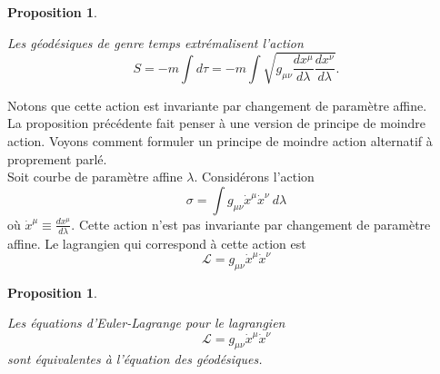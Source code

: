 \documentclass[a4paper,11pt]{report}
\theoremstyle{definition}
\theoremstyle{plain}
\newtheorem{prop}[thm]{Proposition}
\theoremstyle{definition}
\theoremstyle{remark}
\begin{document}
            \begin{prop}\begin{leftbar}
                Les géodésiques de genre temps extrémalisent l'action
                \begin{equation}
                    S = -m\int d\tau = -m\int \sqrt{g_{\mu\nu}\frac{dx^\mu}{d\lambda}\frac{dx^\nu}{d\lambda}}.
                \end{equation}
            \end{leftbar}\end{prop}
            
            Notons que cette action est invariante par changement de paramètre affine.\\
            
            La proposition précédente fait penser à une version de principe de moindre action. Voyons comment formuler un principe de moindre action alternatif à proprement parlé.\\
            
            Soit courbe de paramètre affine $\lambda$. Considérons l'action
            \begin{equation}
                \sigma = \int g_{\mu\nu}\dot{x}^\mu\dot{x}^\nu~d\lambda
            \end{equation}
            où $\dot{x}^\mu\equiv\frac{dx^\mu}{d\lambda}$. Cette action n'est pas invariante par changement de paramètre affine. Le lagrangien qui correspond à cette action est 
            \begin{equation}
                \mathscr{L} = g_{\mu\nu}\dot{x}^\mu\dot{x}^\nu
            \end{equation}
            
            \begin{prop}\begin{leftbar}
                Les équations d'Euler-Lagrange pour le lagrangien
                \begin{equation}
                \mathscr{L} = g_{\mu\nu}\dot{x}^\mu\dot{x}^\nu
                \end{equation}
                sont équivalentes à l'équation des géodésiques.
            \end{leftbar}\end{prop}
            
\end{document}
